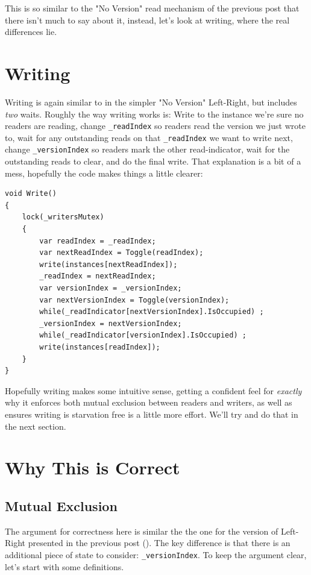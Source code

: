 \documentclass[11pt]{article}
\begin{document}
This is so similar to the "No Version" read mechanism of the previous post that there isn't much to say about it, instead, let's look at writing, where the real differences lie.

\section{Writing}

Writing is again similar to in the simpler "No Version" Left-Right, but includes \emph{two} waits. Roughly the way writing works is: Write to the instance we're sure no readers are reading, change \texttt{\_readIndex} so readers read the version we just wrote to, wait for any outstanding reads on that \texttt{\_readIndex} we want to write next, change \texttt{\_versionIndex} so readers mark the other read-indicator, wait for the outstanding reads to clear, and do the final write. That explanation is a bit of a mess, hopefully the code makes things a little clearer:

\begin{lstlisting}
void Write()
{
    lock(_writersMutex)
    {
        var readIndex = _readIndex;
        var nextReadIndex = Toggle(readIndex);
        write(instances[nextReadIndex]);
        _readIndex = nextReadIndex;
        var versionIndex = _versionIndex;
        var nextVersionIndex = Toggle(versionIndex);
        while(_readIndicator[nextVersionIndex].IsOccupied) ;
        _versionIndex = nextVersionIndex;
        while(_readIndicator[versionIndex].IsOccupied) ;
        write(instances[readIndex]);
    }
}
\end{lstlisting}

Hopefully writing makes some intuitive sense, getting a confident feel for \emph{exactly} why it enforces both mutual exclusion between readers and writers, as well as ensures writing is starvation free is a little more effort. We'll try and do that in the next section.

\section{Why This is Correct}

\subsection{Mutual Exclusion}

The argument for correctness here is similar the the one for the version of Left-Right presented in the previous post (\texttt{}). The key difference is that there is an additional piece of state to consider: \texttt{\_versionIndex}. To keep the argument clear, let's start with some definitions. 
\end{document}
